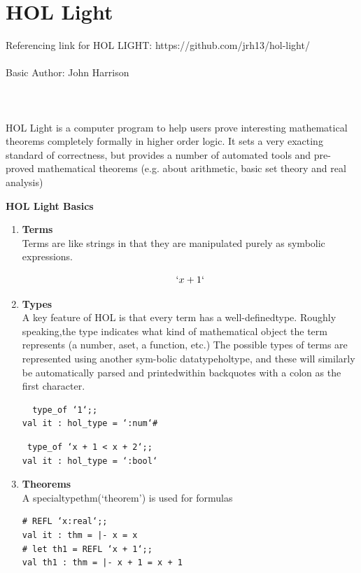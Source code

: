 \documentclass[15]{article}
\begin{document}
\section{HOL Light}
Referencing link for HOL LIGHT:   https://github.com/jrh13/hol-light/
\\
\\
Basic
Author: John Harrison 
\\
\\
\\
\\
HOL Light is a computer program to help users prove interesting mathematical theorems completely formally in higher order logic. It sets a very exacting standard of correctness, but provides a number of automated tools and pre-proved mathematical theorems (e.g. about arithmetic, basic set theory and real analysis)
\pagebreak

\textbf{HOL Light Basics}

\begin{enumerate}

\item \textbf{Terms}
\\
Terms are like  strings  in  that  they  are  manipulated  purely  as  symbolic  expressions.

$$ {`}x+1{`} $$   

\item \textbf{Types}
\\
A key feature of HOL is that every term has a well-definedtype.  Roughly speaking,the type indicates what kind of mathematical object the term represents (a number, aset, a function, etc.)  The possible types of terms are represented using another sym-bolic datatypeholtype, and these will similarly be automatically parsed and printedwithin backquotes with a colon as the first character.


\begin{verbatim}  type_of ‘1‘;;
val it : hol_type = ‘:num‘# 
\end{verbatim}

\begin{verbatim} type_of ‘x + 1 < x + 2‘;;
val it : hol_type = ‘:bool‘
\end{verbatim}


\item \textbf{Theorems}\\
 A specialtypethm(‘theorem’) is used for formulas


\begin{verbatim}
# REFL ‘x:real‘;;
val it : thm = |- x = x 
# let th1 = REFL ‘x + 1‘;;
val th1 : thm = |- x + 1 = x + 1
\end{verbatim}
\end{enumerate}
\end{document}

